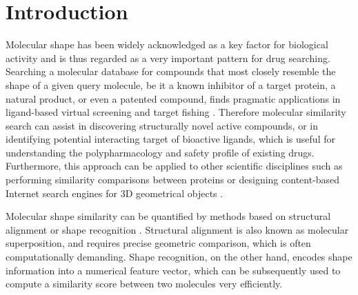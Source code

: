 \documentclass[a4,center,fleqn]{NAR}
\begin{document}
\enlargethispage{-65.1pt}

\section{Introduction}

Molecular shape has been widely acknowledged as a key factor for biological activity and is thus regarded as a very important pattern for drug searching. Searching a molecular database for compounds that most closely resemble the shape of a given query molecule, be it a known inhibitor of a target protein, a natural product, or even a patented compound, finds pragmatic applications in ligand-based virtual screening \cite{1332,1380,1281,1504,1502,1615} and target fishing \cite{1528,1407,1408,1402}. Therefore molecular similarity search can assist in discovering structurally novel active compounds, or in identifying potential interacting target of bioactive ligands, which is useful for understanding the polypharmacology and safety profile of existing drugs. Furthermore, this approach can be applied to other scientific disciplines such as performing similarity comparisons between proteins or designing content-based Internet search engines for 3D geometrical objects \cite{1280}.

Molecular shape similarity can be quantified by methods based on structural alignment \cite{1440,887,1439,1534} or shape recognition \cite{1379,1338,1331,1675}. Structural alignment is also known as molecular superposition, and requires precise geometric comparison, which is often computationally demanding. Shape recognition, on the other hand, encodes shape information into a numerical feature vector, which can be subsequently used to compute a similarity score between two molecules very efficiently.
\end{document}

